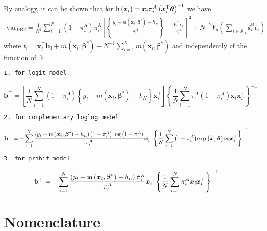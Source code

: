 \documentclass[
  letterpaper,
  DIV=11,
  numbers=noendperiod]{scrreprt}
\begin{document}
By analogy, it can be shown that for
\(\operatorname{h}\left(\boldsymbol{x}_i\right) = \boldsymbol{x}_i \pi_i^A\left(\boldsymbol{x}_i^{\mathrm{T}} \boldsymbol{\theta} \right)^{-1}\)
we have \[
\begin{gathered}
\text{var}_{\mathrm{DR} 2}=\frac{1}{N^2} \sum_{i=1}^N\left(1-\pi_i^{\mathrm{A}}\right) \pi_i^{\mathrm{A}}\left[\left\{\frac{y_i-m\left(\boldsymbol{x}_i, \boldsymbol{\beta}^*\right)-h_{\mathrm{N}}}{\pi_i^A}\right\} -
\frac{\mathbf{b}_3^{\top} \boldsymbol{x}_i}{\pi_i^A}\right]^2 + N^{-2} V_p\left(\sum_{i \in \mathcal{S}_{\mathrm{B}}} d_i^{\mathrm{B}} t_i\right)
\end{gathered}
\] where
\(t_i= \boldsymbol{x}_i^{\top} \mathbf{b}_3+m\left(\boldsymbol{x}_i, \boldsymbol{\beta}^*\right)-N^{-1} \sum_{i=1}^N m\left(\boldsymbol{x}_i, \boldsymbol{\beta}^*\right)\)
and independently of the function of \(\operatorname{h}\)

\begin{verbatim}
1. for logit model
\end{verbatim}

\[
\mathbf{b}^{\top}=\left[\frac{1}{N} \sum_{i=1}^N\left(1-\pi_i^A\right)\left\{y_i-m\left(\boldsymbol{x}_i, \boldsymbol{\beta}^*\right)-h_N\right\} \boldsymbol{x}_i^{\top}\right]\left\{\frac{1}{N} \sum_{i=1}^N \pi_i^A\left(1-\pi_i^A\right) \boldsymbol{x}_i \boldsymbol{x}_i^{\top}\right\}^{-1}
\]

\begin{verbatim}
2. for complementary loglog model
\end{verbatim}

\[\mathbf{b}^{\top} = -\sum_{i=1}^N \frac{\left(y_i - \operatorname{m}\left(\boldsymbol{x}_i,\boldsymbol{\beta}^*\right) - h_n\right)\left(1 - \pi_i^A\right) \log \left(1 - \pi_i^A\right)}{\pi_i^A}\boldsymbol{x}_i^{\top} \left\{\frac{1}{N}\sum_{i=1}^N \left(1 - \pi_i^A\right) \exp\left(\boldsymbol{x}_i^{\top}\boldsymbol{\theta}\right) \boldsymbol{x}_i \boldsymbol{x}_i^{\top}\right\} ^ {-1}\]

\begin{verbatim}
3. for probit model
\end{verbatim}

\[\mathbf{b}^{\top} = -\sum_{i=1}^N \frac{\left(y_i - \operatorname{m}\left(\boldsymbol{x}_i,\boldsymbol{\beta}^*\right) - h_n\right)\dot{\pi}_i^A}{\pi_i^A}\boldsymbol{x}_i^{\top} \left\{\frac{1}{N}\sum_{i=1}^N \pi_i^A \boldsymbol{x}_i \boldsymbol{x}_i^{\top}\right\} ^ {-1}\]

\hypertarget{nomenclature}{%
\chapter{Nomenclature}\label{nomenclature}}
\end{document}
